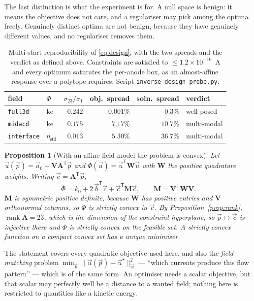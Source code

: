 \documentclass[11pt,a4paper]{article}
\newcommand{\vect}[1]{\mathbf{#1}}
\DeclareMathOperator{\rank}{rank}
\theoremstyle{plain}
\newtheorem{proposition}{Proposition}
\theoremstyle{definition}
\theoremstyle{remark}
\begin{document}
\noindent
The last distinction is what the experiment is for. A null space is benign: it
means the objective does not care, and a regulariser may pick among the optima
freely. Genuinely distinct optima are not benign, because they have genuinely
different values, and no regulariser removes them.

\begin{table}[t]
\centering
\small
\begin{tabular}{@{}llrrrl@{}}
\toprule
field & $\Phi$ & $\sigma_{23}/\sigma_1$ & obj.\ spread & soln.\ spread & verdict \\
\midrule
\texttt{full3d}    & $\mathrm{ke}$          & $0.242$ & $0.001\%$ & $0.3\%$  & well posed \\
\texttt{midacd}    & $\mathrm{ke}$          & $0.175$ & $7.17\%$  & $10.7\%$ & multi-modal \\
\texttt{interface} & $\eta_{\mathrm{std}}$  & $0.013$ & $5.30\%$  & $\mathbf{36.7\%}$ & multi-modal \\
\bottomrule
\end{tabular}
\caption{Multi-start reproducibility of \eqref{eq:design}, with the two spreads
and the verdict as defined above. Constraints are satisfied to
$\le1.2\times10^{-10}$~A and every optimum saturates the per-anode box, as an
almost-affine response over a polytope requires. Script
\texttt{inverse\_design\_probe.py}.}
\label{tab:inverse}
\end{table}

\begin{proposition}[With an affine field model the problem is convex]
\label{prop:convex}
Let $\vec u(\vec p) = \vec u_0 + \vect{V}\vect{A}^{\mathsf{T}}\vec p$ and
$\Phi(\vec u) = \vec u^{\mathsf{T}}\vect{W}\vec u$ with $\vect{W}$ the positive
quadrature weights. Writing $\vec c = \vect{A}^{\mathsf{T}}\vec p$,
\[
  \Phi = k_0 + 2\,\vec b^{\mathsf{T}}\vec c + \vec c^{\mathsf{T}}\vect{M}\vec c,
  \qquad \vect{M} = \vect{V}^{\mathsf{T}}\vect{W}\vect{V} .
\]
$\vect{M}$ is symmetric positive definite, because $\vect{W}$ has positive
entries and $\vect{V}$ orthonormal columns, so $\Phi$ is strictly convex in
$\vec c$. By Proposition~\ref{prop:rank}, $\rank\vect{A}=23$, which is the
dimension of the constraint hyperplane, so $\vec p \mapsto \vec c$ is injective
there and $\Phi$ is strictly convex on the feasible set. A strictly convex
function on a compact convex set has a unique minimiser.
\end{proposition}

\noindent
The statement covers every quadratic objective used here, and also the
\emph{field-matching} problem $\min_{\vec p}\|\vec u(\vec p)-\vec u^\star\|^2_{\vec w}$
--- ``which currents produce this flow pattern'' --- which is of the same form.
An optimiser needs a scalar objective, but that scalar may perfectly well be a
distance to a wanted field; nothing here is restricted to quantities like a
kinetic energy.
\end{document}
